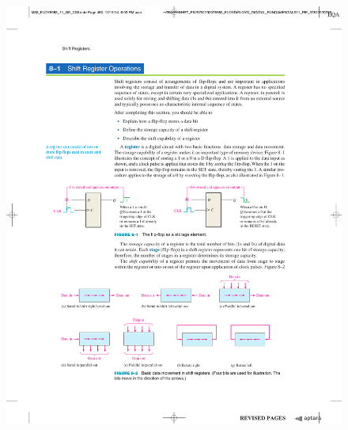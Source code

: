 \begin{figure}[H]
    \centering
    \hspace{0.88cm}
    \includegraphics[scale = 1]{Graphics/Practice 5/SHIFT_REGISTER_BASICS/D-Latch_Operation_451_1.pdf}
\end{figure}

